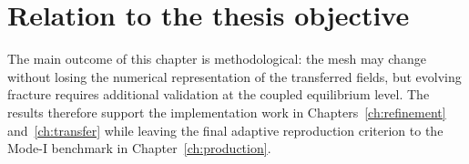 \section{Relation to the thesis objective}
The main outcome of this chapter is methodological: the mesh may change without losing the numerical representation of the transferred fields, but evolving fracture requires additional validation at the coupled equilibrium level. The results therefore support the implementation work in Chapters~\ref{ch:refinement} and~\ref{ch:transfer} while leaving the final adaptive reproduction criterion to the Mode-I benchmark in Chapter~\ref{ch:production}.
